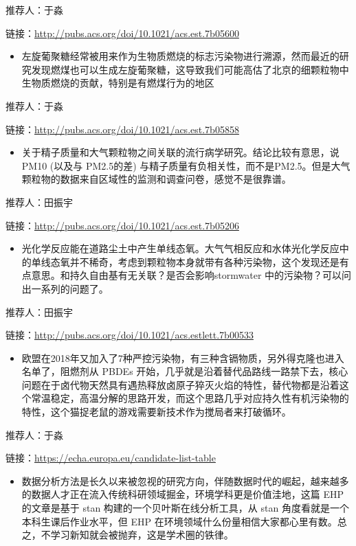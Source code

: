 \documentclass[
]{book}
\providecommand{\tightlist}{%
  \setlength{\itemsep}{0pt}\setlength{\parskip}{0pt}}
\begin{document}
推荐人：于淼

链接：\url{http://pubs.acs.org/doi/10.1021/acs.est.7b05600}

\begin{itemize}
\tightlist
\item
  左旋葡聚糖经常被用来作为生物质燃烧的标志污染物进行溯源，然而最近的研究发现燃煤也可以生成左旋葡聚糖，这导致我们可能高估了北京的细颗粒物中生物质燃烧的贡献，特别是有燃煤行为的地区
\end{itemize}

推荐人：于淼

链接：\url{http://pubs.acs.org/doi/10.1021/acs.est.7b05858}

\begin{itemize}
\tightlist
\item
  关于精子质量和大气颗粒物之间关联的流行病学研究。结论比较有意思，说 PM10 (以及与 PM2.5的差) 与精子质量有负相关性，而不是PM2.5。但是大气颗粒物的数据来自区域性的监测和调查问卷，感觉不是很靠谱。
\end{itemize}

推荐人：田振宇

链接：\url{http://pubs.acs.org/doi/10.1021/acs.est.7b05206}

\begin{itemize}
\tightlist
\item
  光化学反应能在道路尘土中产生单线态氧。大气气相反应和水体光化学反应中的单线态氧并不稀奇，考虑到颗粒物本身就带有各种污染物，这个发现还是有点意思。和持久自由基有无关联？是否会影响stormwater 中的污染物？可以问出一系列的问题了。
\end{itemize}

推荐人：田振宇

链接：\url{http://pubs.acs.org/doi/10.1021/acs.estlett.7b00533}

\begin{itemize}
\tightlist
\item
  欧盟在2018年又加入了7种严控污染物，有三种含镉物质，另外得克隆也进入名单了，阻燃剂从 PBDEs 开始，几乎就是沿着替代品路线一路禁下去，核心问题在于卤代物天然具有遇热释放卤原子猝灭火焰的特性，替代物都是沿着这个常温稳定，高温分解的思路开发，而这个思路几乎对应持久性有机污染物的特性，这个猫捉老鼠的游戏需要新技术作为搅局者来打破循环。
\end{itemize}

推荐人：于淼

链接：\url{https://echa.europa.eu/candidate-list-table}

\begin{itemize}
\tightlist
\item
  数据分析方法是长久以来被忽视的研究方向，伴随数据时代的崛起，越来越多的数据人才正在流入传统科研领域掘金，环境学科更是价值洼地，这篇 EHP 的文章是基于 stan 构建的一个贝叶斯在线分析工具，从 stan 角度看就是一个本科生课后作业水平，但 EHP 在环境领域什么份量相信大家都心里有数。总之，不学习新知就会被抛弃，这是学术圈的铁律。
\end{itemize}
\end{document}
